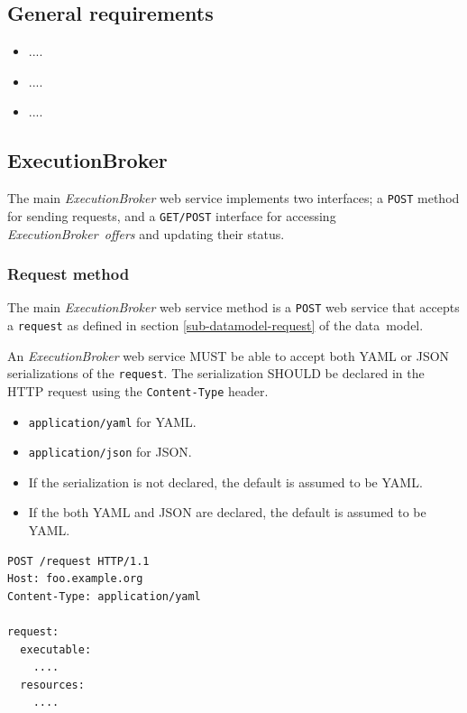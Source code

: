 \documentclass[11pt,a4paper]{ivoa}
\newcommand{\json} {JSON}
\newcommand{\yaml} {YAML}
\newcommand{\datamodel} {data~model}
\newcommand{\webservice} {web service}
\newcommand{\execbrokerclass} {\textit{ExecutionBroker}}
\newcommand{\execoffer}[1] {\textit{ExecutionBroker~offer#1}}
\newcommand{\codeword}[1] {\texttt{#1}}
\begin{document}
\subsection{General requirements}
\label{sub-general-requirements}

\begin{itemize}
    \item ....
    \item ....
    \item ....
\end{itemize}

\subsection{ExecutionBroker}
\label{sub-execution-planner-spec}

The main \execbrokerclass{} \webservice{} implements two interfaces;
a \codeword{POST} method for sending requests, and a \codeword{GET/POST}
interface for accessing \execoffer{s} and updating their status.

\subsubsection{Request method}
\label{subsub-execution-planner-request}

The main \execbrokerclass{} \webservice{} method is a \codeword{POST} \webservice{} that accepts
a \codeword{request} as defined in section \ref{sub-datamodel-request} of the \datamodel{}.

An \execbrokerclass{} \webservice{} MUST be able to accept both \yaml{} or \json{} serializations
of the \codeword{request}.
The serialization SHOULD be declared in the HTTP request using the \codeword{Content-Type} header.
\begin{itemize}
    \item \codeword{application/yaml} for \yaml{}.
    \item \codeword{application/json} for \json{}.
    \item If the serialization is not declared, the default is assumed to be \yaml{}.
    \item If the both \yaml{} and \json{} are declared, the default is assumed to be \yaml{}.
\end{itemize}

\begin{lstlisting}[]
POST /request HTTP/1.1
Host: foo.example.org
Content-Type: application/yaml

request:
  executable:
    ....
  resources:
    ....
\end{lstlisting}
\end{document}
